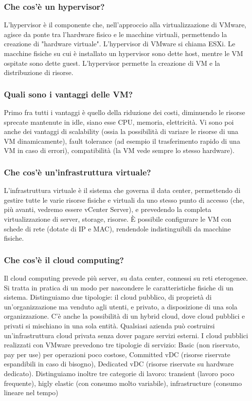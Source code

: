 \documentclass[11pt]{article}
\begin{document}
\subsubsection{Che cos'è un hypervisor?}
L'hypervisor è il componente che, nell'approccio alla virtualizzazione di VMware, agisce da ponte tra l'hardware fisico e le macchine virtuali, permettendo la creazione di "hardware virtuale". L'hypervisor di VMware si chiama ESXi. Le macchine fisiche su cui è installato un hypervisor sono dette host, mentre le VM ospitate sono dette guest. L'hypervisor permette la creazione di VM e la distribuzione di risorse.

\subsubsection{Quali sono i vantaggi delle VM?}
Primo fra tutti i vantaggi è quello della riduzione dei costi, diminuendo le risorse sprecate mantenute in idle, siano esse CPU, memoria, elettricità. Vi sono poi anche dei vantaggi di scalability (ossia la possibilità di variare le risorse di una VM dinamicamente), fault tolerance (ad esempio il trasferimento rapido di una VM in caso di errori), compatibilità (la VM vede sempre lo stesso hardware).

\subsubsection{Che cos'è un'infrastruttura virtuale?}
L'infrastruttura virtuale è il sistema che governa il data center, permettendo di gestire tutte le varie risorse fisiche e virtuali da uno stesso punto di accesso (che, più avanti, vedremo essere vCenter Server), e prevedendo la completa virtualizzazione di server, storage, risorse. È possibile configurare le VM con schede di rete (dotate di IP e MAC), rendendole indistinguibili da macchine fisiche.

\subsubsection{Che cos'è il cloud computing?}
Il cloud computing prevede più server, su data center, connessi su reti eterogenee. Si tratta in pratica di un modo per nascondere le caratteristiche fisiche di un sistema. Distinguiamo due tipologie: il cloud pubblico, di proprietà di un'organizzazione ma venduto agli utenti, e privato, a disposizione di una sola organizzazione. C'è anche la possibilità di un hybrid cloud, dove cloud pubblici e privati si mischiano in una sola entità. Qualsiasi azienda può costruirsi un'infrastruttura cloud privata senza dover pagare servizi esterni. I cloud pubblici realizzati con VMware prevedono tre tipologie di servizio: Basic (non riservato, pay per use) per operazioni poco costose, Committed vDC (risorse riservate espandibili in caso di bisogno), Dedicated vDC (risorse riservate su hardware dedicato). Distinguiamo inoltre tre categorie di lavoro: transient (lavoro poco frequente), higly elastic (con consumo molto variabile), infrastructure (consumo lineare nel tempo)
\end{document}
